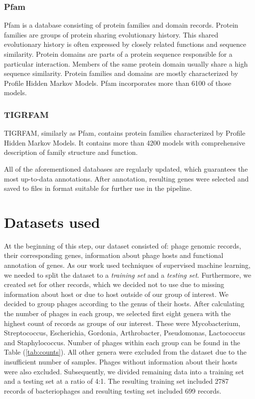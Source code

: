 \subsubsection{Pfam}
Pfam is a database consisting of protein families and domain records.
Protein families are groups of protein sharing evolutionary history.
This shared evolutionary history is often expressed by closely related functions and sequence similarity.
Protein domains are parts of a protein sequence responsible for a particular interaction. 
Members of the same protein domain usually share a high sequence similarity.
Protein families and domains are mostly characterized by Profile Hidden Markov Models.
Pfam incorporates more than 6100 of those models.

\subsubsection{TIGRFAM}
TIGRFAM, similarly as Pfam, contains protein families characterized by Profile Hidden Markov Models.
It contains more than 4200 models with comprehensive description of family structure and function.

\vspace{\baselineskip}

All of the aforementioned databases are regularly updated, which guarantees the most up-to-data annotations.
After annotation, resulting genes were selected and saved to files in format suitable for further use in the pipeline.

\section{Datasets used}
At the beginning of this step, our dataset consisted of: phage genomic records, their corresponding genes, information about phage hosts and functional annotation of genes.
As our work used techniques of supervised machine learning, we needed to split the dataset to a \emph{training set} and a \emph{testing set}.
Furthermore, we created set for other records, which we decided not to use due to missing information about host or due to host outside of our group of interest.
We decided to group phages according to the genus of their hosts.
After calculating the number of phages in each group, we selected first eight genera with the highest count of records as groups of our interest.
These were Mycobacterium, Streptococcus, Escherichia, Gordonia, Arthrobacter, Pseudomonas, Lactococcus and Staphylococcus.
Number of phages within each group can be found in the Table (\ref{tab:counts}).
All other genera were excluded from the dataset due to the insufficient number of samples.
Phages without information about their hosts were also excluded.
Subsequently, we divided remaining data into a training set and a testing set at a ratio of 4:1.
The resulting training set included 2787 records of bacteriophages and resulting testing set included 699 records.

